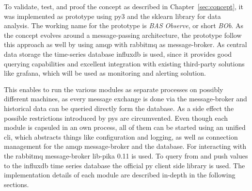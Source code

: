 
\begin{comment}
\begin{itemize}
	\item implementation in \gls{py} 3
	\item command line interface with subcommand as central entrypoint providing configuration and log management
	\item each process is run as separate processes to mitigate \gls{gil} limitations
	\item process has one task (agent simulator, collector, analyser module)
	\item modules/process pass messages mainly using \gls{amqp} and \gls{rabbitmq} as message broker
	\item reusing \gls{influxdb} and \gls{rabbitmq} by separating pipelines using a project name
\end{itemize}
\end{comment}

To validate, test, and proof the concept as described in Chapter~\ref{sec:concept}, it was implemented as prototype using \gls{py}3 and the \gls{sklearn} library for data analysis.
The working name for the prototype is \emph{BAS Observe}, or short \emph{BOb}.
As the concept evolves around a message-passing architecture, the prototype follow this approach as well by using \gls{amqp} with \gls{rabbitmq} as message-broker. As central data storage the time-series database \gls{influxdb} is used, since it provides good querying capabilities and excellent integration with existing third-party solutions like \gls{grafana}, which will be used as monitoring and alerting solution.

This enables to run the various modules as separate processes on possibly different machines, as every message exchange is done via the message-broker and historical data can be queried directly form the database.
As a side effect the possible restrictions introduced by \gls{py}s  are circumvented.
Even though each module is capsuled in an own process, all of them can be started using an unified \gls{cli}, which abstracts things like configuration and logging, as well as connection management for the \gls{amqp} message-broker and the database.
For interacting with the \gls{rabbitmq} message-broker \gls{lib-pika} 0.11 is used. To query from and push values to the \gls{influxdb} time series database the official \gls{py} client side library is used.
The implementation details of each module are described in-depth in the following sections.

